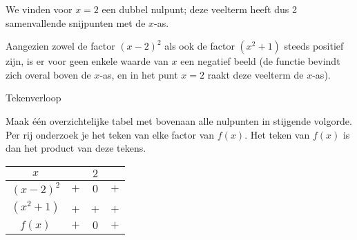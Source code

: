 \begin{voorbeeld}
We vinden voor $x=2$ een dubbel nulpunt; deze veelterm
heeft dus 2 samenvallende snijpunten met de $x$-as.

Aangezien zowel de factor $(x-2)^{2}$ als ook de factor
$(x^{2}+1)$ steeds positief zijn, is er voor geen enkele waarde van
$x$ een negatief beeld (de functie bevindt zich overal boven de $x$-as,
en in het punt $x=2$ raakt deze veelterm de $x$-as).


Tekenverloop

Maak \'e\'en overzichtelijke tabel met bovenaan alle nulpunten
in stijgende volgorde. Per rij onderzoek je het teken van elke factor
van $f(x)$. Het teken van $f(x)$ is dan het product van deze tekens.

\begin{center}
\begin{tabular}{c||ccc}
$x$ &  & $2$ & \\
\hline 
$(x-2)^{2}$ & $+$ & $0$ & \multicolumn{1}{c}{$+$}\\
$(x^{2}+1)$ & +&+&+\\
\hline 
$f(x)$ & $+$ & $0$ & $+$\\
\end{tabular}
\par\end{center}

\end{voorbeeld}